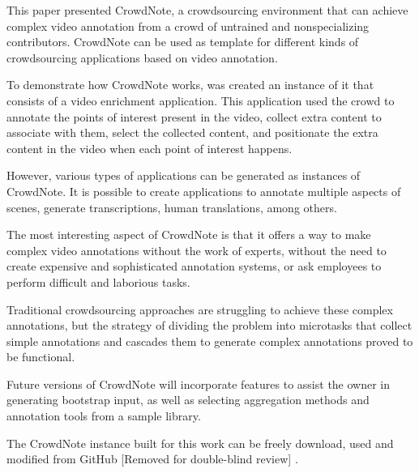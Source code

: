 This paper presented CrowdNote, a crowdsourcing environment that can achieve complex video annotation from a crowd of untrained and nonspecializing contributors. CrowdNote can be used as template for different kinds of crowdsourcing applications based on video annotation.

To demonstrate how CrowdNote works, was created an instance of it that consists of a video enrichment application. This application used the crowd to annotate the points of interest present in the video, collect extra content to associate with them, select the collected content, and positionate the extra content in the video when each point of interest happens.

However, various types of applications can be generated as instances of CrowdNote. It is possible to create applications to annotate multiple aspects of scenes, generate transcriptions, human translations, among others.

The most interesting aspect of CrowdNote is that it offers a way to make complex video annotations without the work of experts, without the need to create expensive and sophisticated annotation systems, or ask employees to perform difficult and laborious tasks.

Traditional crowdsourcing approaches are struggling to achieve these complex annotations, but the strategy of dividing the problem into microtasks that collect simple annotations and cascades them to generate complex annotations proved to be functional.

Future versions of CrowdNote will incorporate features to assist the owner in generating bootstrap input, as well as selecting aggregation methods and annotation tools from a sample library.

The CrowdNote instance built for this work can be freely download, used and modified from GitHub [Removed for double-blind review] . 

